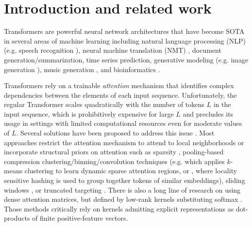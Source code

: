 \section{Introduction and related work}
\label{sec:intro_related_work}

Transformers \citep{transformer, universal_t} are powerful neural network architectures that have become SOTA in several areas of machine learning including natural language processing (NLP) (e.g. speech recognition \citep{luo}), neural machine translation (NMT) \citep{nmt}, document generation/summarization, time series prediction, generative modeling (e.g. image generation \citep{parmar}), music generation \citep{simon}, and bioinformatics \citep{rives, progen, ingraham2019generative, elnaggar2019end, du2020energy}. 

Transformers rely on a trainable \textit{attention} mechanism that identifies complex dependencies between the elements of each input sequence. Unfortunately, the regular Transformer scales quadratically with the number of tokens $L$ in the input sequence, which is prohibitively expensive for large $L$ and precludes its usage in settings with limited computational resources even for moderate values of $L$. 
Several solutions have been proposed to address this issue \citep{longformer, conformer, imputer, sparsetr, image_transformer}. Most approaches restrict the attention mechanism to attend to local neighborhoods \citep{parmar} or incorporate structural priors on attention such as sparsity \citep{sparsetr}, pooling-based compression \citep{compr} clustering/binning/convolution techniques (e.g. \citep{routing_t} which applies $k$-means clustering to learn dynamic sparse attention regions, or \citep{reformer}, where locality sensitive hashing is used to group together tokens of similar embeddings), sliding windows \citep{longformer}, or truncated targeting \citep{chelba}. 
There is also a long line of research on using dense attention matrices, but defined by low-rank kernels
substituting softmax \citep{trans-rnns, shen}. Those methods critically rely on kernels admitting explicit representations as dot-products of finite positive-feature vectors.

